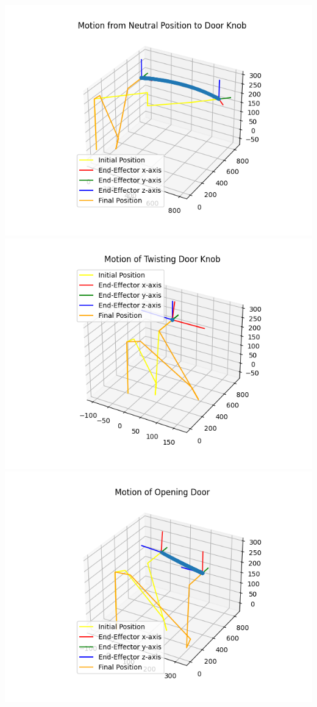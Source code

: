 \documentclass[11pt]{article}
\begin{document}
\includegraphics{Motion from Neutral Position to Door Knob}
\includegraphics{Motion of Twisting Door Knob}
\includegraphics{Motion of Opening Door}
\end{document}
